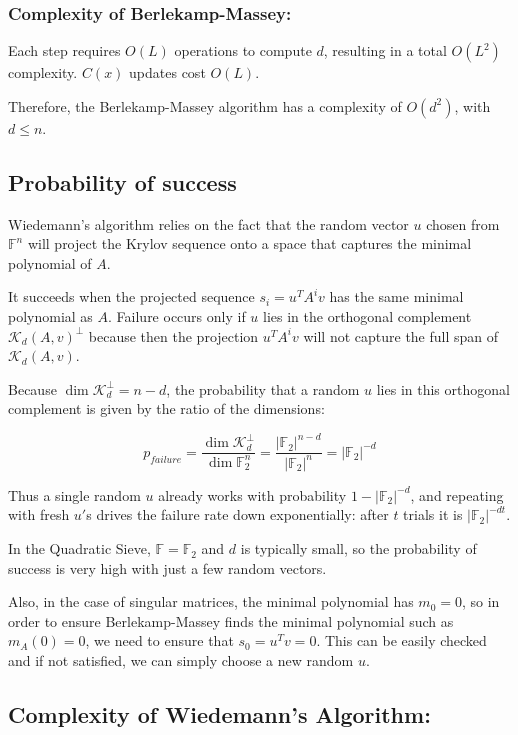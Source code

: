 \documentclass[a4paper, 11pt]{article}
\begin{document}
\subsubsection{Complexity of Berlekamp-Massey:}

Each step requires $O(L)$ operations to compute $d$, resulting in a total $O(L^2)$ complexity.
$C(x)$ updates cost $O(L)$.

Therefore, the Berlekamp-Massey algorithm has a complexity of $O(d^2)$, with $d \leq n$.

\subsection{Probability of success}

Wiedemann's algorithm relies on the fact that the random vector $u$ chosen from $\mathbb{F}^n$ will project the Krylov sequence onto a space that captures the minimal polynomial of $A$.

It succeeds when the projected sequence $s_i=u^TA^iv$ has the same minimal polynomial as $A$. Failure occurs only if $u$ lies in the orthogonal complement $\mathcal{K}_d(A,v)^\perp$ because then the projection $u^TA^iv$ will not capture the full span of $\mathcal{K}_d(A,v)$.

Because $\dim\mathcal{K}_d^\perp=n-d$, the probability that a random $u$ lies in this orthogonal complement is given by the ratio of the dimensions:

\begin{equation}
p_{failure}=\frac{\dim\mathcal{K}_d^\perp}{\dim\mathbb{F}_2^n}=\frac{|\mathbb{F}_2|^{n-d}}{|\mathbb{F}_2|^n}=|\mathbb{F}_2|^{-d}
\end{equation}


Thus a single random $u$ already works with probability $1-|\mathbb{F}_2|^{-d}$, and repeating with fresh $u'$s drives the failure rate down exponentially: after $t$ trials it is $|\mathbb{F}_2|^{-dt}$.

In the Quadratic Sieve, $\mathbb{F} = \mathbb{F}_2$ and $d$ is typically small, so the probability of success is very high with just a few random vectors.

Also, in the case of singular matrices, the minimal polynomial has $m_0=0$, so in order to ensure Berlekamp-Massey finds the minimal polynomial such as $m_A(0) = 0$, we need to ensure that $s_0 = u^Tv = 0$. This can be easily checked and if not satisfied, we can simply choose a new random $u$.

\subsection{Complexity of Wiedemann's Algorithm:}
\end{document}
